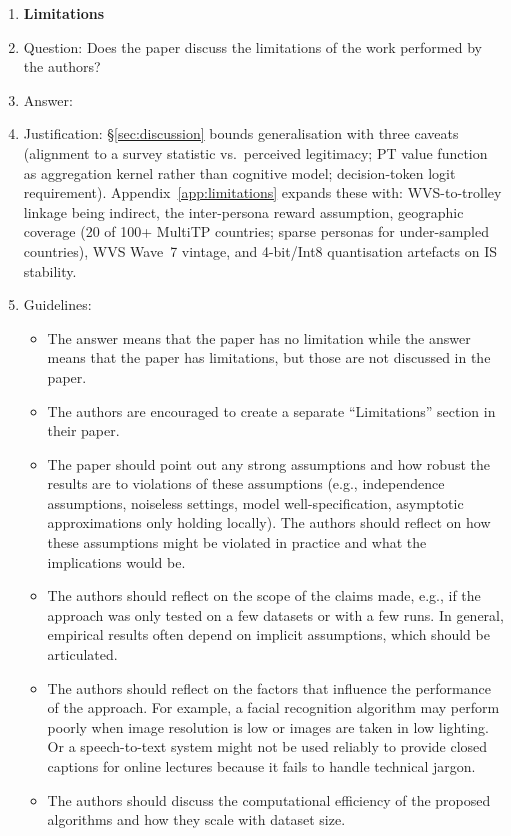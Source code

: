 \begin{enumerate}
\item {\bf Limitations}
    \item[] Question: Does the paper discuss the limitations of the work performed by the authors?
    \item[] Answer: \answerYes{}
    \item[] Justification: \S\ref{sec:discussion} bounds generalisation with three caveats (alignment to a survey statistic vs.\ perceived legitimacy; PT value function as aggregation kernel rather than cognitive model; decision-token logit requirement). Appendix~\ref{app:limitations} expands these with: WVS-to-trolley linkage being indirect, the inter-persona reward assumption, geographic coverage (20 of 100+ MultiTP countries; sparse personas for under-sampled countries), WVS Wave~7 vintage, and 4-bit/Int8 quantisation artefacts on IS stability.
    \item[] Guidelines:
    \begin{itemize}
        \item The answer \answerNA{} means that the paper has no limitation while the answer \answerNo{} means that the paper has limitations, but those are not discussed in the paper. 
        \item The authors are encouraged to create a separate ``Limitations'' section in their paper.
        \item The paper should point out any strong assumptions and how robust the results are to violations of these assumptions (e.g., independence assumptions, noiseless settings, model well-specification, asymptotic approximations only holding locally). The authors should reflect on how these assumptions might be violated in practice and what the implications would be.
        \item The authors should reflect on the scope of the claims made, e.g., if the approach was only tested on a few datasets or with a few runs. In general, empirical results often depend on implicit assumptions, which should be articulated.
        \item The authors should reflect on the factors that influence the performance of the approach. For example, a facial recognition algorithm may perform poorly when image resolution is low or images are taken in low lighting. Or a speech-to-text system might not be used reliably to provide closed captions for online lectures because it fails to handle technical jargon.
        \item The authors should discuss the computational efficiency of the proposed algorithms and how they scale with dataset size.

\end{itemize}
\end{enumerate}
